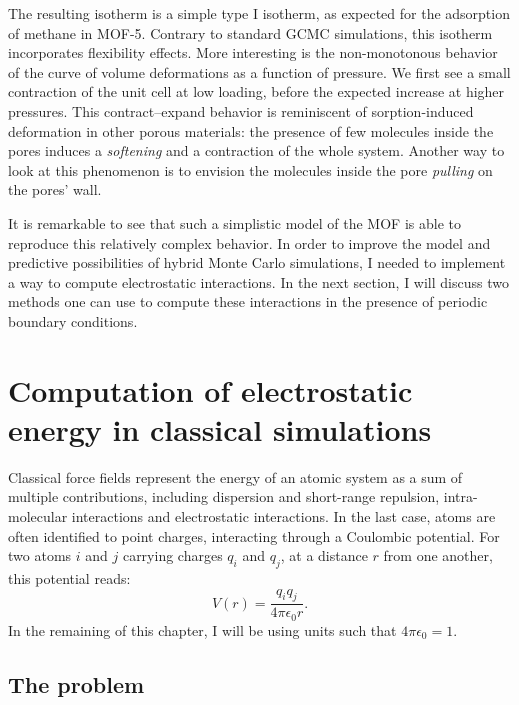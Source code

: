 \documentclass[thesis]{subfiles}
\begin{document}
The resulting isotherm is a simple type I isotherm, as expected for the
adsorption of methane in MOF-5. Contrary to standard GCMC simulations, this
isotherm incorporates flexibility effects. More interesting is the non-monotonous
behavior of the curve of volume deformations as a function of pressure. We first
see a small contraction of the unit cell at low loading, before the expected
increase at higher pressures. This contract--expand behavior is reminiscent of
sorption-induced deformation in other porous materials\cite{Balzer2013,
Mouhat2015}: the presence of few molecules inside the pores induces a
\emph{softening} and a contraction of the whole system. Another way to look at
this phenomenon is to envision the molecules inside the pore \emph{pulling} on
the pores' wall.

It is remarkable to see that such a simplistic model of the MOF is able to
reproduce this relatively complex behavior. In order to improve the model and
predictive possibilities of hybrid Monte Carlo simulations, I needed to
implement a way to compute electrostatic interactions. In the next section, I
will discuss two methods one can use to compute these interactions in the
presence of periodic boundary conditions.

\newpage
\section{Computation of electrostatic energy in classical simulations}
\label{sec:electrostatic}

Classical force fields represent the energy of an atomic system as a sum of
multiple contributions, including dispersion and short-range repulsion,
intra-molecular interactions and electrostatic interactions. In the last case,
atoms are often identified to point charges, interacting through a Coulombic
potential. For two atoms $i$ and $j$ carrying charges $q_i$ and $q_j$, at a
distance $r$ from one another, this potential reads:
\[ V(r) = \frac{q_i q_j}{4 \pi \epsilon_0 r}.\]
In the remaining of this chapter, I will be using units such that $4 \pi
\epsilon_0 = 1$.

\subsection{The problem}
\end{document}
